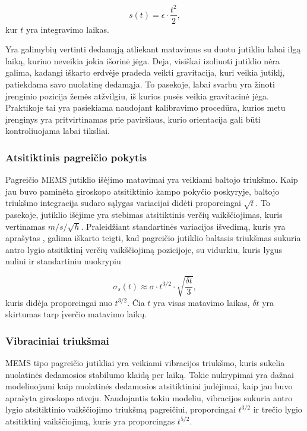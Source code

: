 \begin{equation}
    s(t) = \epsilon \cdot \frac{t^2}{2},
\end{equation}
kur $t$ yra integravimo laikas.

Yra galimybių vertinti dedamąją atliekant matavimus su duotu jutikliu labai ilgą laiką, kuriuo neveikia jokia išorinė jėga. 
Deja, visiškai izoliuoti jutiklio nėra galima, kadangi iškarto erdvėje pradeda veikti gravitacija, kuri veikia jutiklį, patiekdama savo nuolatinę dedamąja. 
To pasekoje, labai svarbu yra žinoti įrenginio pozicija žemės atžvilgiu, iš kurios pusės veikia gravitacinė jėga. Praktikoje tai yra pasiekiama naudojant kalibravimo procedūra, kurios metu įrenginys yra pritvirtinamas prie paviršiaus, kurio orientacija gali būti kontroliuojama labai tiksliai.

\subsubsection{Atsitiktinis pagreičio pokytis}

Pagreičio MEMS jutiklio išėjimo matavimai yra veikiami baltojo triukšmo. 
Kaip jau buvo paminėta giroskopo atsitiktinio kampo pokyčio poskyryje, baltojo triukšmo integracija sudaro sąlygas variacijai didėti proporcingai $\sqrt{t}$. 
To pasekoje, jutiklio išėjime yra stebimas atsitiktinis verčių vaikščiojimas, kuris vertinamas $m/s/\sqrt{h}$. Praleidžiant standartinės variacijos išvedimą, kuris yra aprašytas \cite{woodman2007introduction}, galima iškarto teigti, kad pagreičio jutiklio baltasis triukšmas sukuria antro lygio atsitiktinį verčių vaikščiojimą pozicijoje, su vidurkiu, kuris lygus nuliui ir standartiniu nuokrypiu

\begin{equation}
    \sigma_{s}(t) \approx \sigma \cdot t^{3/2} \cdot \sqrt{\frac{\delta t}{3}},
\end{equation}
kuris didėja proporcingai nuo $t^{3/2}$. 
Čia $t$ yra visas matavimo laikas, $\delta t$ yra skirtumas tarp įverčio matavimo laikų.

\subsubsection{Vibraciniai triukšmai}

MEMS tipo pagreičio jutikliai yra veikiami vibracijos triukšmo, kuris sukelia nuolatinės dedamosios stabilumo klaidą per laiką. 
Tokie nukrypimai yra dažnai modeliuojami kaip nuolatinės dedamosios atsitiktiniai judėjimai, kaip jau buvo aprašyta giroskopo atveju. 
Naudojantis tokiu modeliu, vibracijos sukuria antro lygio atsitiktinio vaikščiojimo triukšmą pagreičiui, proporcingai $t^{3/2}$ ir trečio lygio atsitiktinį vaikščiojimą, kuris yra proporcingas $t^{5/2}$.

